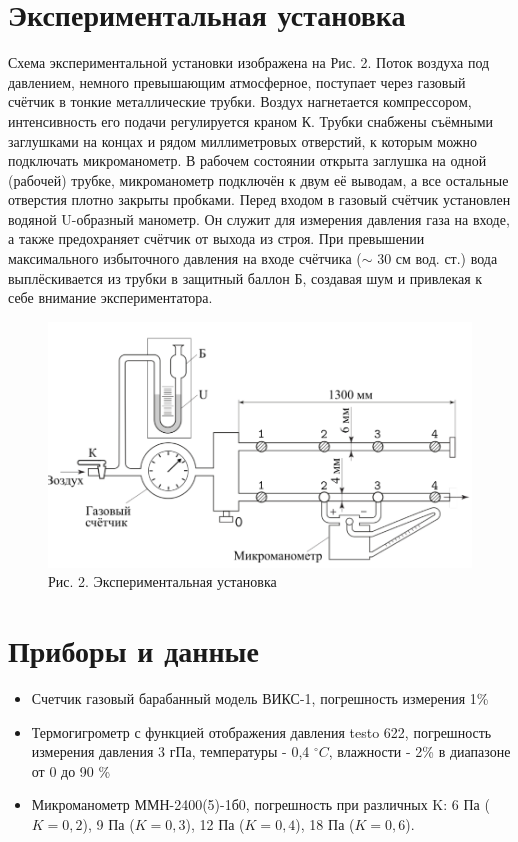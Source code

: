 \documentclass[a4paper]{article}
\begin{document}
\section{Экспериментальная установка}
Схема экспериментальной установки изображена на Рис. 2. Поток воздуха
под давлением, немного превышающим атмосферное, поступает через газовый счётчик в тонкие металлические трубки. Воздух нагнетается компрессором, интенсивность его подачи регулируется краном К. Трубки снабжены
съёмными заглушками на концах и рядом миллиметровых отверстий, к которым можно подключать микроманометр. В рабочем состоянии открыта заглушка на одной (рабочей) трубке, микроманометр подключён к двум её выводам, а все остальные отверстия плотно закрыты пробками.
Перед входом в газовый счётчик установлен водяной U-образный манометр. Он служит для измерения давления газа на входе, а также предохраняет
счётчик от выхода из строя. При превышении максимального избыточного
давления на входе счётчика ($\sim$ 30 см вод. ст.) вода выплёскивается из трубки
в защитный баллон Б, создавая шум и привлекая к себе внимание экспериментатора.
\begin{figure}[h!]
        \centering
        \includegraphics[scale=0.5]{Ustanovka.png}
        \caption{
        Рис. 2. Экспериментальная установка
        }
 \end{figure} 

\section{Приборы и данные}
\begin{itemize}
    \item Счетчик газовый барабанный модель ВИКС-1, погрешность измерения 1\%
    \item Термогигрометр с функцией отображения давления testo 622, погрешность измерения давления 3 гПа, температуры - 0,4 $^\circ C$, влажности - 2\% в диапазоне от 0 до 90 \%
    \item Микроманометр ММН-2400(5)-1б0, погрешность при различных K: 6 Па ($K = 0,2$), 9 Па ($K = 0,3$), 12 Па ($K = 0,4$), 18 Па ($K = 0,6$).
\end{itemize}
\end{document}
